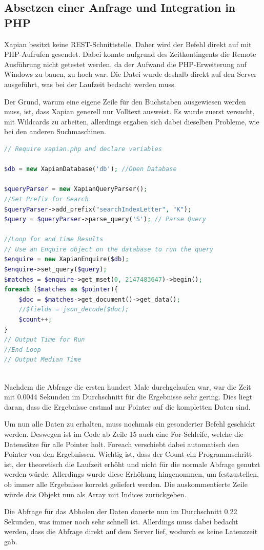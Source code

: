 \subsection{Absetzen einer Anfrage und Integration in PHP}

Xapian besitzt keine REST-Schnittstelle. Daher wird der Befehl direkt auf mit PHP-Aufrufen gesendet. Dabei konnte aufgrund des Zeitkon­tin­gents die Remote Ausführung nicht getestet werden, da der Aufwand die PHP-Erweiterung auf Windows zu bauen, zu hoch war. Die Datei wurde deshalb direkt auf den Server ausgeführt, was bei der Laufzeit bedacht werden muss. 

Der Grund, warum eine eigene Zeile für den Buchstaben ausgewiesen werden muss, ist, dass Xapian generell nur Volltext ausweist. Es wurde zuerst versucht, mit Wildcards zu arbeiten, allerdings ergaben sich dabei dieselben Probleme, wie bei den anderen Suchmaschinen.

\begin{lstlisting}[language=php, frame=single, label={lst:XapPhpQuery}, 
	morekeywords={type,uninvertible,indexed,stored,field,multiValued, name}, caption=Skript zur Suche von Daten in Xapian,captionpos=b] 
// Require xapian.php and declare variables

$db = new XapianDatabase('db'); //Open Database

$queryParser = new XapianQueryParser();
//Set Prefix for Search
$queryParser->add_prefix("searchIndexLetter", "K"); 
$query = $queryParser->parse_query('S'); // Parse Query

//Loop for and time Results
// Use an Enquire object on the database to run the query
$enquire = new XapianEnquire($db);
$enquire->set_query($query);
$matches = $enquire->get_mset(0, 2147483647)->begin();
foreach ($matches as $pointer){
	$doc = $matches->get_document()->get_data();
	//$fields = json_decode($doc);
	$count++;
}
// Output Time for Run
//End Loop 
// Output Median Time
	
\end{lstlisting}

Nachdem die Abfrage die ersten hundert Male durchgelaufen war, war die Zeit mit 0.0044 Sekunden im Durchschnitt für die Ergebnisse sehr gering. Dies liegt daran, dass die Ergebnisse erstmal nur Pointer auf die kompletten Daten sind. 

Um nun alle Daten zu erhalten, muss nochmals ein gesonderter Befehl geschickt werden. Deswegen ist im Code ab Zeile 15 auch eine For-Schleife, welche die Datensätze für alle Pointer holt. Foreach verschiebt dabei automatisch den Pointer von den Ergebnissen. Wichtig ist, dass der Count ein Programmschritt ist, der theoretisch die Laufzeit erhöht und nicht für die normale Abfrage genutzt werden würde. Allerdings wurde diese Erhöhung hingenommen, um festzustellen, ob immer alle Ergebnisse korrekt geliefert werden.
Die auskommentierte Zeile würde das Objekt nun als Array mit Indices zurückgeben. 

Die Abfrage für das Abholen der Daten dauerte nun im Durchschnitt 0.22 Sekunden, was immer noch sehr schnell ist. Allerdings muss dabei bedacht werden, dass die Abfrage direkt auf dem Server lief, wodurch es keine Latenzzeit gab.
